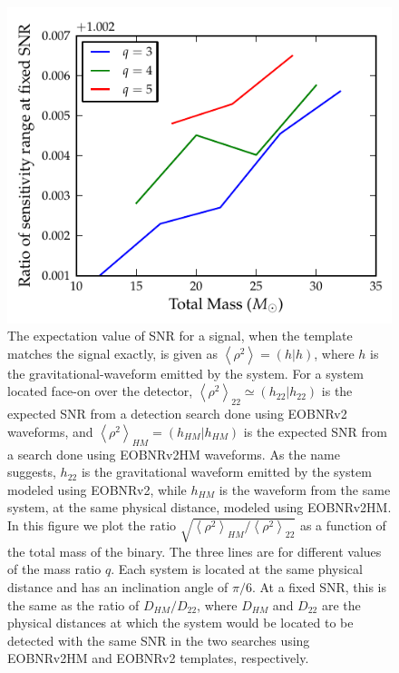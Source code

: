 \documentclass[aps,
prd,
amsmath,
amssymb,
twocolumn,
floatfix,
groupedaddress]{revtex4-1}
\begin{document}
\begin{figure}
\centering
\includegraphics[scale=0.04, clip=false, totalheight=0.3\textheight, width=\columnwidth]{RatioOfSigsHM22.pdf}
\caption{\label{fig:RatioOfRangesHM22}The expectation value of SNR for a signal, when the template matches the signal exactly, is given as $\left\langle\rho^2\right\rangle = (h|h)$, where $h$ is the gravitational-waveform emitted by the system. For a system located face-on over the detector, $\left\langle\rho^2\right\rangle_{22} \simeq (h_{22}|h_{22})$ is the expected SNR from a detection search done using EOBNRv2 waveforms, and $\left\langle\rho^2\right\rangle_{HM} = (h_{HM}|h_{HM})$ is the expected SNR from a search done using EOBNRv2HM waveforms. As the name suggests, $h_{22}$ is the gravitational waveform emitted by the system modeled using EOBNRv2, while $h_{HM}$ is the waveform from the same system, at the same physical distance, modeled using EOBNRv2HM. In this figure we plot the ratio $\sqrt{\left\langle\rho^2\right\rangle_{HM}/\left\langle\rho^2\right\rangle_{22}}$ as a function of the total mass of the binary. The three lines are for different values of the mass ratio $q$. Each system is located at 
the same physical distance and has an inclination angle of $\pi/6$. At a fixed SNR, this is the same as the ratio of $D_{HM}/D_{22}$, where $D_{HM}$ and $D_{22}$ are the physical distances at which the system would be located to be detected with the same SNR in the two searches using EOBNRv2HM and EOBNRv2 templates, respectively.}
\end{figure}
\end{document}
